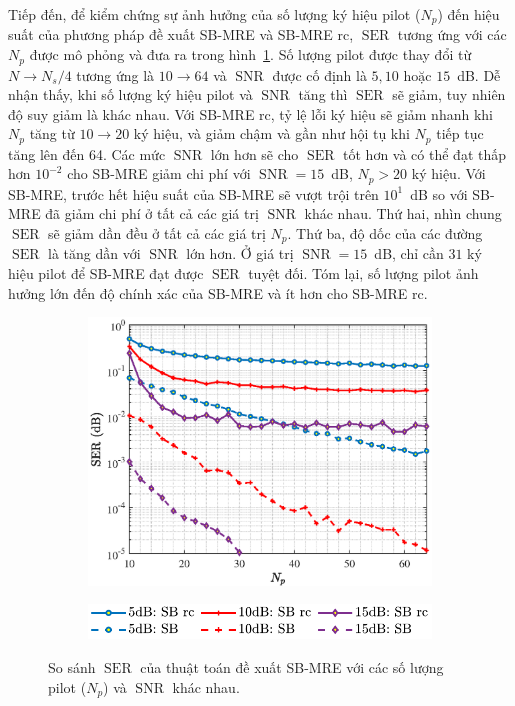 Tiếp đến, để kiểm chứng sự ảnh hưởng của số lượng ký hiệu pilot ($N_p$) đến hiệu suất của phương pháp đề xuất SB-MRE và SB-MRE rc, $\operatorname{SER}$ tương ứng với các $N_p$ được mô phỏng và đưa ra trong hình~\ref{fig:vary_N_p}. Số lượng pilot được thay đổi từ $N \rightarrow N_s/4$ tương ứng là $10\rightarrow 64$ và $\operatorname{SNR}$ được cố định là $5, 10$ hoặc $15$~dB. Dễ nhận thấy, khi số lượng ký hiệu pilot và $\operatorname{SNR}$ tăng thì $\operatorname{SER}$ sẽ giảm, tuy nhiên độ suy giảm là khác nhau. Với SB-MRE rc, tỷ lệ lỗi ký hiệu sẽ giảm nhanh khi $N_p$ tăng từ $10 \rightarrow 20$ ký hiệu, và giảm chậm và gần như hội tụ khi $N_p$ tiếp tục tăng lên đến 64. Các mức $\operatorname{SNR}$ lớn hơn sẽ cho $\operatorname{SER}$ tốt hơn và có thể đạt thấp hơn $10^{-2}$ cho SB-MRE giảm chi phí với $\operatorname{SNR}=15$~dB, $N_p > 20$ ký hiệu. Với SB-MRE, trước hết hiệu suất của SB-MRE sẽ vượt trội trên $10^1$~dB so với SB-MRE đã giảm chi phí ở tất cả các giá trị $\operatorname{SNR}$ khác nhau. Thứ hai, nhìn chung $\operatorname{SER}$ sẽ giảm dần đều ở tất cả các giá trị $N_p$. Thứ ba, độ dốc của các đường $\operatorname{SER}$ là tăng dần với $\operatorname{SNR}$ lớn hơn. Ở giá trị $\operatorname{SNR}=15$~dB, chỉ cần $31$ ký hiệu pilot để SB-MRE đạt được $\operatorname{SER}$ tuyệt đối. Tóm lại, số lượng pilot ảnh hưởng lớn đến độ chính xác của SB-MRE và ít hơn cho SB-MRE rc.
\begin{figure}[ht]
    \centering
    \begin{subfigure}[b]{\textwidth}
         \centering
         \includegraphics[width=\linewidth]{figures/vary_N_p_1.eps}
     \end{subfigure}
     \hfill
     \begin{subfigure}[b]{0.7\textwidth}
         \centering
         \includegraphics[width=\linewidth]{figures/legend.pdf}
     \end{subfigure}
     \hfill
    \caption{So sánh $\operatorname{SER}$ của thuật toán đề xuất SB-MRE với các số lượng pilot ($N_p$) và $\operatorname{SNR}$ khác nhau.}
    \label{fig:vary_N_p}
\end{figure}

